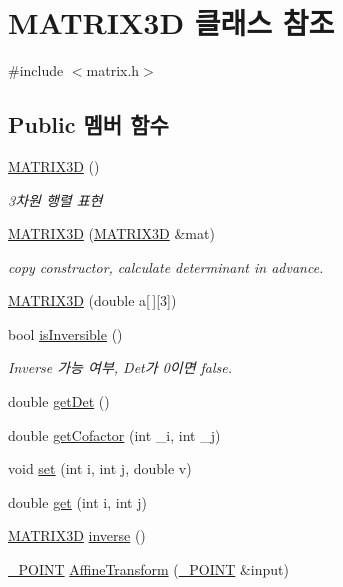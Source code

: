 \hypertarget{class_m_a_t_r_i_x3_d}{\section{M\-A\-T\-R\-I\-X3\-D 클래스 참조}
\label{class_m_a_t_r_i_x3_d}
}


{\ttfamily \#include $<$matrix.\-h$>$}

\subsection*{Public 멤버 함수}
\begin{DoxyCompactItemize}
\item 
\hyperlink{class_m_a_t_r_i_x3_d_a85e81a995201846d602ab80f502626e6}{M\-A\-T\-R\-I\-X3\-D} ()
\begin{DoxyCompactList}\small\item\em 3차원 행렬 표현 \end{DoxyCompactList}\item 
\hyperlink{class_m_a_t_r_i_x3_d_a464aa49f42a93b7ec7af34cad6db379f}{M\-A\-T\-R\-I\-X3\-D} (\hyperlink{class_m_a_t_r_i_x3_d}{M\-A\-T\-R\-I\-X3\-D} \&mat)
\begin{DoxyCompactList}\small\item\em copy constructor, calculate determinant in advance. \end{DoxyCompactList}\item 
\hyperlink{class_m_a_t_r_i_x3_d_a767e7bb59466d96793b89a7f2db0a1a4}{M\-A\-T\-R\-I\-X3\-D} (double a\mbox{[}$\,$\mbox{]}\mbox{[}3\mbox{]})
\item 
bool \hyperlink{class_m_a_t_r_i_x3_d_ae04bbddf00d6572e12b67eb9a0d6d55f}{is\-Inversible} ()
\begin{DoxyCompactList}\small\item\em Inverse 가능 여부, Det가 0이면 false. \end{DoxyCompactList}\item 
double \hyperlink{class_m_a_t_r_i_x3_d_ab9708baa5af2ffe980632870e88c1559}{get\-Det} ()
\item 
double \hyperlink{class_m_a_t_r_i_x3_d_a23292251c50eab390168914069cefc0e}{get\-Cofactor} (int \-\_\-i, int \-\_\-j)
\item 
void \hyperlink{class_m_a_t_r_i_x3_d_ac3e4b69526d21abcc0db1ddd1718b6a8}{set} (int i, int j, double v)
\item 
double \hyperlink{class_m_a_t_r_i_x3_d_a215a4ab44606797cd7f2b1551cd05431}{get} (int i, int j)
\item 
\hyperlink{class_m_a_t_r_i_x3_d}{M\-A\-T\-R\-I\-X3\-D} \hyperlink{class_m_a_t_r_i_x3_d_a4133adf628205e22c49d420d80f4336e}{inverse} ()
\item 
\hyperlink{class___p_o_i_n_t}{\-\_\-\-P\-O\-I\-N\-T} \hyperlink{class_m_a_t_r_i_x3_d_a9c5556589092317bb63fbb8b681035ab}{Affine\-Transform} (\hyperlink{class___p_o_i_n_t}{\-\_\-\-P\-O\-I\-N\-T} \&input)
\end{DoxyCompactItemize}

